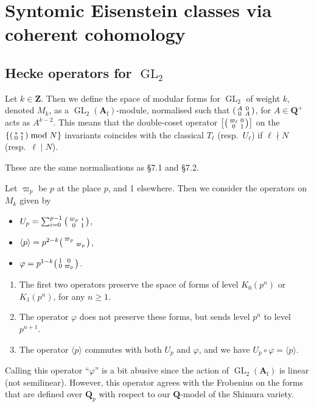 \documentclass[cjm]{ipart}
\newenvironment{smatrix}{\left( \begin{smallmatrix} } {\end{smallmatrix} \right) }
\newcommand{\stbt}[4]{\begin{smatrix}#1 & #2 \\ #3 & #4\end{smatrix}}
\theoremstyle{plain}
\theoremstyle{remark}
\DeclareMathOperator{\GL}{GL}
\newcommand{\Af}{\AA_{\mathrm{f}}}
\newcommand{\QQ}{\mathbf{Q}}
\newcommand{\Qp}{\QQ_p}
\newcommand{\ZZ}{\mathbf{Z}}
\renewcommand{\AA}{\mathbf{A}}
\numberwithin{equation}{subsection}
\renewcommand{\ge}{\geqslant}
\begin{document}
 \section{Syntomic Eisenstein classes via coherent cohomology}

\subsection{Hecke operators for $\GL_2$}

Let $k \in \ZZ$. Then we define the space of modular forms for $\GL_2$ of weight $k$, denoted $M_{k}$, as a $\GL_2(\Af)$-module, normalised such that $\stbt A 0 0 A$, for $A \in \QQ^+$ acts as $A^{k-2}$. This means that the double-coset operator $\left[\stbt{\varpi_\ell}{0}{0}{1}\right]$ on the $\{ \stbt{*}{*}{0}{1} \bmod N\}$ invariants coincides with the classical $T_\ell$ (resp.~$U_\ell$) if $\ell \nmid N$ (resp.~$\ell \mid N$).

\begin{remark}
 These are the same normalisations as \cite{LPSZ1} \S7.1 and \S7.2.
\end{remark}

Let $\varpi_p$ be $p$ at the place $p$, and 1 elsewhere. Then we consider the operators on $M_k$ given by
\begin{itemize}
 \item $U_p = \sum_{i = 0}^{p-1}\stbt{\varpi_p}{i}{0}{1}$,\smallskip
 \item $\langle p \rangle = p^{2-k} \stbt{\varpi_p}{}{}{\varpi_p}$,\smallskip
 \item $\varphi = p^{1-k} \stbt{1}{0}{0}{\varpi_p}$.
\end{itemize}

\begin{note}
 \begin{enumerate}
  \item The first two operators preserve the space of forms of level $K_0(p^n)$ or $K_1(p^n)$, for any $n \ge 1$.
  \item The operator $\varphi$ does not preserve these forms, but sends level $p^n$ to level $p^{n+1}$.
  \item The operator $\langle p \rangle$ commutes with both $U_p$ and $\varphi$, and we have $U_p \circ \varphi = \langle p \rangle$.
 \end{enumerate}
\end{note}

\begin{remark}
 Calling this operator ``$\varphi$'' is a bit abusive since the action of $\GL_2(\Af)$ is linear (not semilinear). However, this operator agrees with the Frobenius on the forms that are defined over $\Qp$ with respect to our $\QQ$-model of the Shimura variety.
\end{remark}
\end{document}
